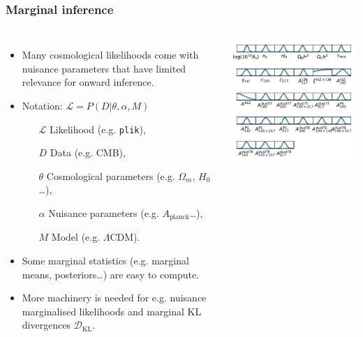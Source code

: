 \documentclass[aspectratio=169]{beamer}
\begin{document}
\begin{frame}
    \frametitle{Marginal inference}
    \begin{columns}
        \begin{itemize}
            \item Many cosmological likelihoods come with nuisance parameters that have limited relevance for onward inference.
            \item Notation: $\mathcal{L} = P(D|\theta,\alpha,M)$
                \begin{itemize}
                    \item[$\mathcal{L}$] Likelihood \hfill (e.g. \texttt{plik}),
                    \item[$D$] Data \hfill (e.g. CMB),
                    \item[$\theta$] Cosmological parameters \hfill (e.g. $\Omega_m$, $H_0$\ldots),
                    \item[$\alpha$] Nuisance parameters \hfill (e.g. $A_\text{planck}$\ldots),
                    \item[$M$] Model \hfill (e.g. $\Lambda$CDM).
                \end{itemize}
            \item Some marginal statistics (e.g. marginal means, posteriors\ldots) are easy to compute.
            \item More machinery is needed for e.g. nuisance marginalised likelihoods and marginal KL divergences $\mathcal{D}_\text{KL}$.
        \end{itemize}
        \includegraphics{figures/planck_2018_plik.pdf}
    \end{columns}
\end{frame}
\end{document}
